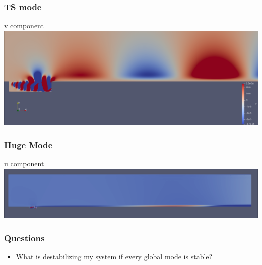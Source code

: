 \documentclass[
	aspectratio=169, %
	t, %
	onlytextwidth, %
	10pt, %
]{beamer}
\begin{document}
\begin{frame}
	\frametitle{TS mode}
	{
	v component
	\includegraphics[width=\linewidth]{Images/zoomedTSv.png}
	}
\end{frame}

\begin{frame}
	\frametitle{Huge Mode}
	
	u component
	{
	\centering
	\includegraphics[width=\linewidth]{Images/HugeMode.png}
	}

\end{frame}
\begin{frame}
	\frametitle{Questions}
	\begin{itemize}
		\item What is destabilizing my system if every global mode is stable?
	\end{itemize}
	
\end{frame}
\end{document}
